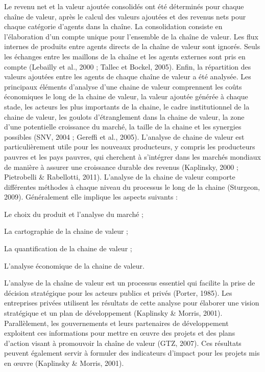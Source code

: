 \documentclass[12pt,oneside]{report}
\begin{document}
Le revenu net et la valeur ajoutée consolidés ont été déterminés pour chaque chaîne de valeur, après le calcul des valeurs ajoutées et des revenus nets pour chaque catégorie d’agents dans la chaîne. La consolidation consiste en l’élaboration d’un compte unique pour l’ensemble de la chaîne de valeur. Les flux internes de produits entre agents directs de la chaîne de valeur sont ignorés. Seuls les échanges entre les maillons de la chaîne et les agents externes sont pris en compte (Lebailly et al., 2000 ; Tallec et Bockel, 2005). Enfin, la répartition des valeurs ajoutées entre les agents de chaque chaîne de valeur a été analysée. Les principaux éléments d'analyse d'une chaine de valeur comprennent les coûts économiques le long de la chaine de valeur, la valeur ajoutée générée à chaque stade, les acteurs les plus importants de la chaine, le cadre institutionnel de la chaine de valeur, les goulots d'étranglement dans la chaine de valeur, la zone d'une potentielle croissance du marché, la taille de la chaine et les synergies possibles (SNV, 2004 ; Gereffi et al., 2005). L'analyse de chaine de valeur est particulièrement utile pour les nouveaux producteurs, y compris les producteurs pauvres et les pays pauvres, qui cherchent à s'intégrer dans les marchés mondiaux de manière à assurer une croissance durable des revenus (Kaplinsky, 2000 ; Pietrobelli \& Rabellotti, 2011). L'analyse de la chaine de valeur comporte différentes méthodes à chaque niveau du processus le long de la chaine (Sturgeon, 2009). Généralement elle implique les aspects suivants :

Le choix du produit et l’analyse du marché ;

La cartographie de la chaine de valeur ;

La quantification de la chaine de valeur ;

L’analyse économique de la chaine de valeur.

L'analyse de la chaîne de valeur est un processus essentiel qui facilite la prise de décision stratégique pour les acteurs publics et privés (Porter, 1985). Les entreprises privées utilisent les résultats de cette analyse pour élaborer une vision stratégique et un plan de développement (Kaplinsky \& Morris, 2001). Parallèlement, les gouvernements et leurs partenaires de développement exploitent ces informations pour mettre en œuvre des projets et des plans d'action visant à promouvoir la chaîne de valeur (GTZ, 2007). Ces résultats peuvent également servir à formuler des indicateurs d'impact pour les projets mis en œuvre (Kaplinsky \& Morris, 2001).
\end{document}
